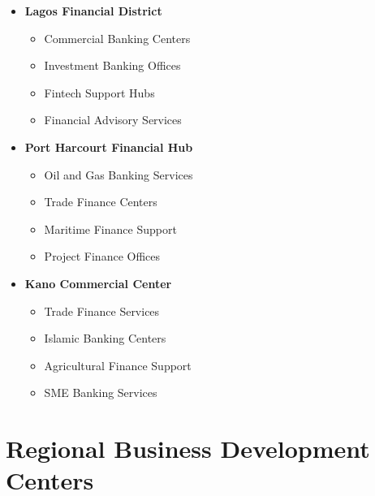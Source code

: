 \begin{tcolorbox}[
    colback=white,
    colframe=primarydark,
    title=\textbf{Banking and Finance Resources},
    before skip=1em,
    after skip=1em
]
    \begin{itemize}[leftmargin=*,itemsep=0.5em]
        \item \textbf{Lagos Financial District}
        \begin{itemize}[itemsep=0.3em]
            \item Commercial Banking Centers
            \item Investment Banking Offices
            \item Fintech Support Hubs
            \item Financial Advisory Services
        \end{itemize}

        \vspace{0.5em}

        \item \textbf{Port Harcourt Financial Hub}
        \begin{itemize}[itemsep=0.3em]
            \item Oil and Gas Banking Services
            \item Trade Finance Centers
            \item Maritime Finance Support
            \item Project Finance Offices
        \end{itemize}

        \vspace{0.5em}

        \item \textbf{Kano Commercial Center}
        \begin{itemize}[itemsep=0.3em]
            \item Trade Finance Services
            \item Islamic Banking Centers
            \item Agricultural Finance Support
            \item SME Banking Services
        \end{itemize}
    \end{itemize}
\end{tcolorbox}


\section{Regional Business Development Centers}\label{sec:development-centers}
\vspace{1em}

